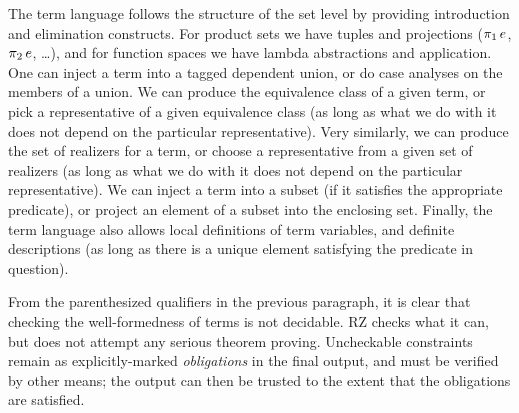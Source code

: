 The term language follows the structure of the set level by providing
introduction and elimination constructs. For product sets we have tuples and
projections ($\mathop{\pi_{1}} e$, $\mathop{\pi_{2}} e$, \ldots), and for function spaces we have lambda abstractions and
application. One can inject a term into a tagged dependent union, or do case analyses
on the members of a union. We can produce the equivalence class of a given
term, or pick a representative of a given equivalence class (as long as what we
do with it does not depend on the particular representative). Very similarly,
we can produce the set of realizers for a term, or choose a representative from
a given set of realizers (as long as what we do with it does not depend on the
particular representative). We can inject a term into a subset (if it satisfies
the appropriate predicate), or project an element of a subset into the
enclosing set. Finally, the term language also allows local definitions of term
variables, and definite descriptions (as long as there is a unique element
satisfying the predicate in question).

From the parenthesized qualifiers in the previous paragraph, it is clear that checking the
well-formedness of terms is not decidable. RZ checks what it can, but does not
attempt any serious theorem proving.  Uncheckable constraints remain as
explicitly-marked \emph{obligations} in the final output, and must be verified
by other means; the output can then be trusted to the extent that the obligations are satisfied.



